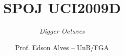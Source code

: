 \title{SPOJ UCI2009D}
\subtitle{{\it Digger Octaves}}
\author{Prof. Edson Alves -- UnB/FGA}
\date{}
